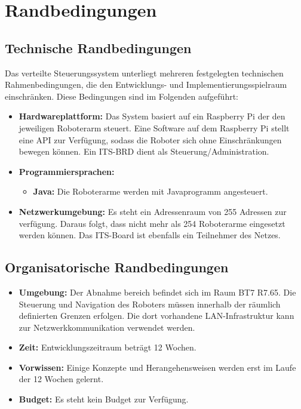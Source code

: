 

\chapter{Randbedingungen}

\section{Technische Randbedingungen}

Das verteilte Steuerungssystem unterliegt mehreren festgelegten technischen Rahmenbedingungen, die den Entwicklungs- und Implementierungsspielraum einschränken. Diese Bedingungen sind im Folgenden aufgeführt:

\begin{itemize}
    \item \textbf{Hardwareplattform:}  Das System basiert auf ein Raspberry Pi der den jeweiligen Roboterarm steuert. Eine Software auf dem Raspberry Pi stellt eine API zur Verfügung, sodass die Roboter sich ohne Einschränkungen bewegen können. %
     Ein ITS-BRD dient als Steuerung/Administration.
    
    \item \textbf{Programmiersprachen:}  
    \begin{itemize}
        \item \textbf{Java:} Die Roboterarme werden mit Javaprogramm angesteuert.
    \end{itemize}
    \item \textbf{Netzwerkumgebung:} Es steht ein Adressenraum von 255 Adressen zur verfügung. Daraus folgt, dass nicht mehr als 254 Roboterarme eingesetzt werden können. Das ITS-Board ist ebenfalls ein Teilnehmer des Netzes.

    
\end{itemize}

\section{Organisatorische Randbedingungen}
\begin{itemize}

    \item \textbf{Umgebung:}  
    Der Abnahme bereich befindet sich im Raum BT7 R7.65. Die Steuerung und Navigation des Roboters müssen innerhalb der räumlich definierten Grenzen erfolgen. Die dort vorhandene LAN-Infrastruktur kann zur Netzwerkkommunikation verwendet werden.
    \item \textbf{Zeit:} Entwicklungszeitraum beträgt 12 Wochen. 
    \item \textbf{Vorwissen:} Einige Konzepte und Herangehensweisen werden erst im Laufe der 12 Wochen gelernt.
    \item \textbf{Budget:} Es steht kein Budget zur Verfügung.

\end{itemize}

